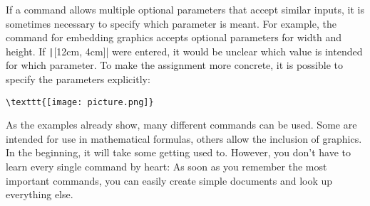 \begin{table}[h!]
	\caption{Examples for \LaTeX-commands}
	\label{tbl:latex-commands}
\end{table}

If a command allows multiple optional parameters that accept similar inputs, it is sometimes necessary to specify which parameter is meant. 
For example, the command for embedding graphics accepts optional parameters for width and height. 
If \texttt|[12cm, 4cm]| were entered, it would be unclear which value is intended for which parameter. 
To make the assignment more concrete, it is possible to specify the parameters explicitly:
\begin{verbatim}
\texttt{[image: picture.png]}
\end{verbatim}

As the examples already show, many different commands can be used. 
Some are intended for use in mathematical formulas, others allow the inclusion of graphics. 
In the beginning, it will take some getting used to. 
However, you don’t have to learn every single command by heart: As soon as you remember the most important commands, you can easily create simple documents and look up everything else.

